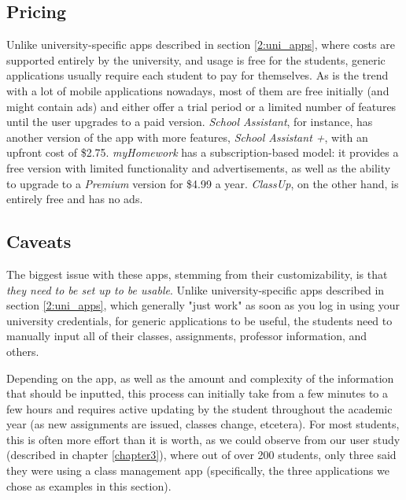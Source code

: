     \subsection{Pricing} \label{2:generic_apps_pricing}
        Unlike university-specific apps described in section \ref{2:uni_apps}, where costs are supported entirely by the university, and usage is free for the students, generic applications usually require each student to pay for themselves. As is the trend with a lot of mobile applications nowadays, most of them are free initially (and might contain ads) and either offer a trial period or a limited number of features until the user upgrades to a paid version. \textit{School Assistant}, for instance, has another version of the app with more features, \textit{School Assistant +}, with an upfront cost of \$2.75. \textit{myHomework} has a subscription-based model: it provides a free version with limited functionality and advertisements, as well as the ability to upgrade to a \textit{Premium} version for \$4.99 a year. \textit{ClassUp}, on the other hand, is entirely free and has no ads.
        
    \subsection{Caveats} \label{2:generic_apps_caveats}
        The biggest issue with these apps, stemming from their customizability, is that \textit{they need to be set up to be usable}. Unlike university-specific apps described in section \ref{2:uni_apps}, which generally "just work" as soon as you log in using your university credentials, for generic applications to be useful, the students need to manually input all of their classes, assignments, professor information, and others. 
        
        Depending on the app, as well as the amount and complexity of the information that should be inputted, this process can initially take from a few minutes to a few hours and requires active updating by the student throughout the academic year (as new assignments are issued, classes change, etcetera). For most students, this is often more effort than it is worth, as we could observe from our user study (described in chapter \ref{chapter3}), where out of over 200 students, only three said they were using a class management app (specifically, the three applications we chose as examples in this section).
        

